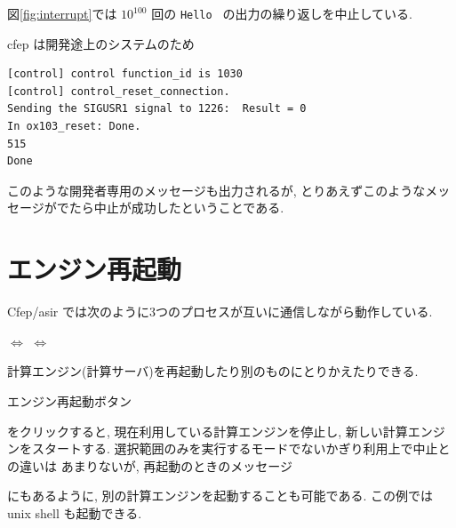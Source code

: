 \documentclass{jbook}
\begin{document}
図\ref{fig:interrupt}では
$10^{100}$ 回の {\tt Hello } の出力の繰り返しを中止している.

cfep は開発途上のシステムのため
\begin{verbatim}
[control] control function_id is 1030
[control] control_reset_connection.
Sending the SIGUSR1 signal to 1226:  Result = 0
In ox103_reset: Done.
515
Done
\end{verbatim}
このような開発者専用のメッセージも出力されるが,
とりあえずこのようなメッセージがでたら中止が成功したということである.


\section{エンジン再起動}

  
Cfep/asir では次のように3つのプロセスが互いに通信しながら動作している.
\begin{center}
 $\Leftrightarrow$ 
$\Leftrightarrow$ 
\end{center}
計算エンジン(計算サーバ)を再起動したり別のものにとりかえたりできる.

  
エンジン再起動ボタン
\begin{center}
\end{center}
をクリックすると,
現在利用している計算エンジンを停止し,
新しい計算エンジンをスタートする.
選択範囲のみを実行するモードでないかぎり利用上で中止との違いは
あまりないが, 再起動のときのメッセージ
\begin{center}
\end{center}
にもあるように, 別の計算エンジンを起動することも可能である.
この例では unix shell も起動できる.
\end{document}
